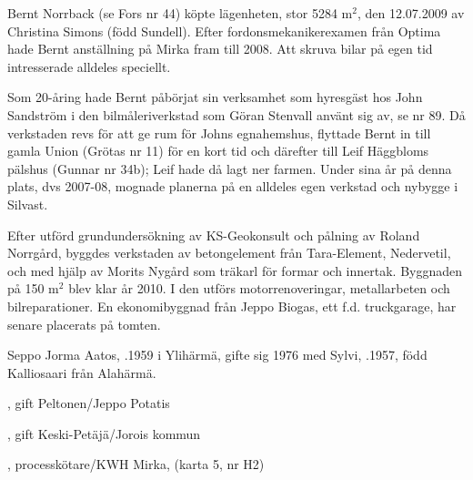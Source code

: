 %



%
Bernt Norrback (se Fors nr 44) köpte lägenheten, stor 5284 m$^2$, den 12.07.2009  av Christina Simons (född Sundell). Efter fordonsmekanikerexamen från Optima hade Bernt anställning på Mirka fram till 2008. Att skruva bilar på egen tid intresserade alldeles speciellt.

Som 20-åring hade Bernt påbörjat sin verksamhet som hyresgäst	hos John Sandström i den bilmåleriverkstad som Göran Stenvall använt sig av, se nr 89. Då verkstaden revs för att ge rum för Johns egnahemshus, flyttade Bernt in till gamla Union (Grötas nr 11) för en kort tid och därefter till Leif Häggbloms pälshus (Gunnar nr 34b); Leif hade då lagt ner farmen. Under sina år på denna plats, dvs 2007-08, mognade	planerna på en alldeles egen verkstad och nybygge i Silvast.

Efter utförd grundundersökning av KS-Geokonsult och pålning av Roland Norrgård, byggdes verkstaden av betongelement från Tara-Element, Nedervetil, och med hjälp av Morits Nygård som träkarl för formar och innertak. Byggnaden på 150 m$^2$ blev klar år 2010. I den utförs	motorrenoveringar, metallarbeten och bilreparationer. En ekonomibyggnad från Jeppo Biogas, ett f.d. truckgarage, har senare placerats på tomten.



%



%
Seppo Jorma Aatos, .1959 i Ylihärmä, gifte sig 1976 med Sylvi, .1957,	född Kalliosaari från Alahärmä.
\begin{jhchildren}
  \item {}, gift Peltonen/Jeppo Potatis
  \item {}, gift Keski-Petäjä/Jorois kommun
  \item {}, processkötare/KWH Mirka, (karta 5, nr H2)
\end{jhchildren}

